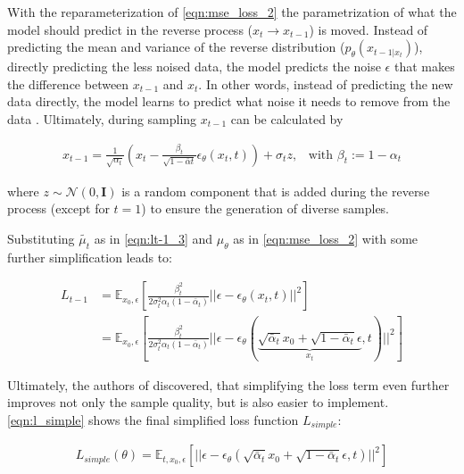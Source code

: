 With the reparameterization of \autoref{eqn:mse_loss_2} the parametrization of what the model should predict in the reverse process ($x_t \rightarrow x_{t-1}$) is moved. 
Instead of predicting the mean and variance of the reverse distribution ($p_\theta(x_{t-1|x_t})$), \ie directly predicting the less noised data, 
the model predicts the noise $\epsilon$ that makes the difference between $x_{t-1}$ and ${x_t}$.
In other words, instead of predicting the new data directly, the model learns to predict what noise it needs to remove from the data \cite{capel2022MasterThesisDenoising}.
Ultimately, during sampling $x_{t-1}$ can be calculated by

\begin{equation}
  \begin{align*}
    \label{eqn:xt-1}
    x_{t-1} = \frac{1}{\sqrt{\alpha_t}}\left(x_t - \frac{\beta_t}{\sqrt{1-\bar{\alpha}t}}\epsilon_{\theta}(x_t,t)\right) + \sigma_t z \textrm{,}\quad
    \textrm{with } \beta_t := 1-\alpha_t
  \end{align*}
\end{equation}

where $z\sim\mathcal{N}(0,\textbf{I})$ is a random component that is added during the reverse process (except for $t=1$) to ensure the generation of diverse samples.

Substituting $\tilde{\mu_t}$ as in \autoref{eqn:lt-1_3} and $\mu_\theta$ as in \autoref{eqn:mse_loss_2} with some further simplification leads to:

\begin{equation}
  \begin{align*}
    \label{eqn:eqn:lt-1_4}
    L_{t-1} &= \mathbb{E}_{x_0,\epsilon} \left[  \frac{\beta^2_t}{2\sigma_t^2 \alpha_t (1-\bar{\alpha}_t)} ||\epsilon - \epsilon_\theta(x_t,t)||^2 \right] \\
    &= \mathbb{E}_{x_0,\epsilon} \left[  \frac{\beta^2_t}{2\sigma_t^2 \alpha_t (1-\bar{\alpha}_t)} ||\epsilon - \epsilon_\theta( \underbrace{\sqrt{\bar{\alpha}_t} x_0 + \sqrt{1-\bar{\alpha}_t}\epsilon}_{x_t}, t)||^2 \right]
  \end{align*}
\end{equation}


Ultimately, the authors of \cite[p. 5]{ho2020DenoisingDiffusionProbabilistic} discovered, that simplifying the loss term even further improves not only the sample quality,
but is also easier to implement.
\autoref{eqn:l_simple} shows the final simplified loss function $L_{simple}$:


\begin{equation}
  \begin{align*}
    \label{eqn:l_simple}
    L_{simple}(\theta) = \mathbb{E}_{t, x_0,\epsilon} \left[ ||\epsilon - \epsilon_\theta( \sqrt{\bar{\alpha}_t} x_0 + \sqrt{1-\bar{\alpha}_t}\epsilon, t)||^2 \right]
  \end{align*}
\end{equation}


